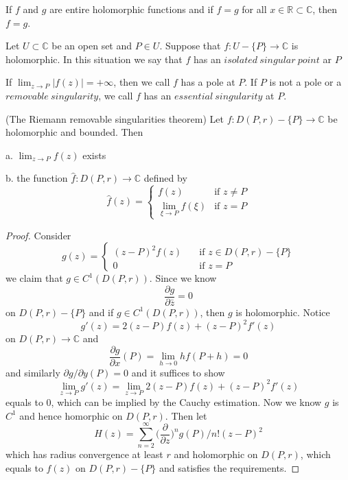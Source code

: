 \documentclass[lang=en, color=blue, ]{elegantbook}
\newcommand{\R}{\mathbb{R}}
\newcommand{\C}{\mathbb{C}}
\newcommand{\ParZ}{\dfrac{\partial}{\partial z}}
\begin{document}
\begin{corollary}
    If $f$ and $g$ are entire holomorphic functions and if $f=g$ for all $x\in\R\subset\C$, then $ f= g$.
\end{corollary}

\begin{definition}
    Let $U\subset\C$ be an open set and $P\in U$. Suppose that $f:U-\{P\}\to \C$ is holomorphic. In this situation we say that $f$ has an $isolated\ singular\ point$ ar $P$
\end{definition}

\begin{definition}
    If $\lim_{z\to P}|f(z)| = +\infty$, then we call $f$ has a pole at $P$. If $P$ is not a pole or a $removable\ singularity$, we call $f$ has an $essential\ singularity$ at $P$.
\end{definition}

\begin{theorem}
    (The Riemann removable singularities theorem) Let $f:D(P,r)-\{P\}\to\C$ be holomorphic and bounded. Then\par
    a. $\lim_{z\to P}f(z)$ exists\par
    b. the function $\hat{f}: D(P,r)\to\C$ defined by
    \[
    \hat{f}(z) = \begin{cases}
        f(z)\quad&\text{if }z\neq P\\
        \lim_{\xi\to P}f(\xi)&\text{if }z=P
    \end{cases}
    \]
\end{theorem}
\begin{proof}\par
    Consider
    \[
    g(z) = \begin{cases}
        (z-P)^2f(z)\quad&\text{if }z\in D(P,r)-\{P\} \\
        0&\text{if }z=P 
    \end{cases}
    \]
    we claim that $g\in C^1(D(P,r))$. Since we know
    \[
    \dfrac{\partial g}{\partial\bar{z}} = 0
    \]
    on $D(P,r)-\{P\}$ and if $g\in C^1(D(P,r))$, then $g$ is holomorphic. Notice
    \[
    g'(z) = 2(z-P)f(z) + (z-P)^2f'(z)
    \]
    on $D(P,r)\to \C$ and
    \[
    \dfrac{\partial g}{\partial x}(P) = \lim_{h\to 0} hf(P+h) = 0 
    \]
    and similarly $\partial g/\partial y (P) = 0$ and it suffices to show
    \[\lim_{z\to P} g'(z) = \lim_{z\to P} 2(z-P)f(z)+(z-P)^2f'(z)\]
    equals to $0$, which can be implied by the Cauchy estimation. Now we know $g$ is $C^1$ and hence homorphic on $D(P,r)$. Then let
    \[H(z) = \sum\limits_{n=2}^{\infty} \Big(\ParZ\Big)^ng(P)/n! (z-P)^2\]
    which has radius convergence at least $r$ and holomorphic on $D(P,r)$, which equals to $f(z)$ on $D(P,r)-\{P\}$ and satisfies the requirements.
\end{proof}
\end{document}
